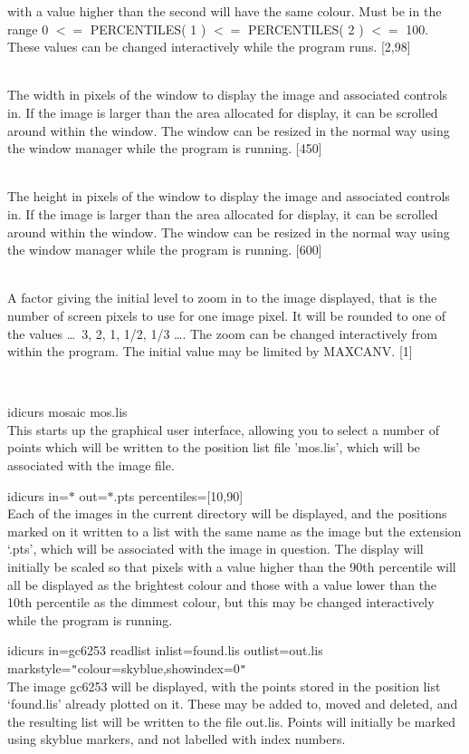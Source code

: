\documentclass[twoside,11pt]{article}
\renewcommand{\_}{\texttt{\symbol{95}}}
\newcommand{\qt}[1]{{\tt "}#1{\tt "}}
\newcommand{\sstexamples}[1]{
   \item[Examples:] \mbox{} \\
   \vspace{-3.5ex}
   \begin{description}
      #1
   \end{description}
}
\newcommand{\sstsubsection}[1]{ \item[{#1}] \mbox{} \\}
\newcommand{\sstexamplesubsection}[2]{\sloppy \item{\ssttt #1} \mbox{} \\ #2 }
\newcommand{\sstnotes}[1]{\item[Notes:] \mbox{} \\[1.3ex] #1}
\newcommand{\sstitemlist}[1]{
  \mbox{} \\
  \vspace{-3.5ex}
  \begin{itemize}
     #1
  \end{itemize}
}
\newcommand{\sstexamples}[1]{
      \item[Examples:] \\
      \begin{description}
         #1
      \end{description}
      \\
   }
\newcommand{\sstsubsection}[1]{\item[{#1}]}
\newcommand{\sstexamplesubsection}[2]{\item[{\ssttt #1}] #2}
\newcommand{\sstnotes}[1]{\item[Notes:] #1 }
\newcommand{\sstitemlist}[1]{
      \begin{itemize}
         #1
      \end{itemize}
      \\
   }
\begin{document}
{{{         with a value higher than the second will have the same colour.
         Must be in the range 0 $<=$ PERCENTILES( 1 ) $<=$ PERCENTILES( 2 ) 
         $<=$ 100.  These values can be changed interactively while the
         program runs.
         [2,98]
      }
      \sstsubsection{
         WINX = \_INTEGER (Read and Write)
      }{
         The width in pixels of the window to display the image and
         associated controls in.  If the image is larger than the area
         allocated for display, it can be scrolled around within the 
         window.  The window can be resized in the normal way using 
         the window manager while the program is running.
         [450]
      }
      \sstsubsection{
         WINY = \_INTEGER (Read and Write)
      }{
         The height in pixels of the window to display the image and
         associated controls in.  If the image is larger than the area
         allocated for display, it can be scrolled around within the
         window.  The window can be resized in the normal way using
         the window manager while the program is running.
         [600]
      }
      \sstsubsection{
         ZOOM = \_INTEGER (Read and Write)
      }{
         A factor giving the initial level to zoom in to the image 
         displayed, that is the number of screen pixels to use for one
         image pixel.  It will be rounded to one of the values 
         \ldots\ 3, 2, 1, 1/2, 1/3 \ldots.  The zoom can be changed 
         interactively from within the program.  The initial value 
         may be limited by MAXCANV.
         [1]
      }
   }
   \sstexamples{
      \sstexamplesubsection{
         idicurs mosaic mos.lis
      }{
         This starts up the graphical user interface, allowing you to
         select a number of points which will be written to the
         position list file 'mos.lis', which will be associated with
         the image file.
      }
      \sstexamplesubsection{
         idicurs in=$*$ out=$*$.pts percentiles=[10,90]
      }{
         Each of the images in the current directory will be displayed,
         and the positions marked on it written to a list with the same
         name as the image but the extension `.pts', which will be
         associated with the image in question.  The display will
         initially be scaled so that pixels with a value higher than
         the 90th percentile will all be displayed as the brightest
         colour and those with a value lower than the 10th percentile
         as the dimmest colour, but this may be changed interactively
         while the program is running.
      }
      \sstexamplesubsection{
         idicurs in=gc6253 readlist inlist=found.lis outlist=out.lis
                 markstyle=\qt{colour=skyblue,showindex=0}
      }{
         The image gc6253 will be displayed, with the points stored in
         the position list `found.lis' already plotted on it.  These
         may be added to, moved and deleted, and the resulting list
         will be written to the file out.lis.  Points will initially
         be marked using skyblue markers, and not labelled with index 
         numbers.
      }
   }
   \sstnotes{
      \sstitemlist{

}}}
\end{document}
